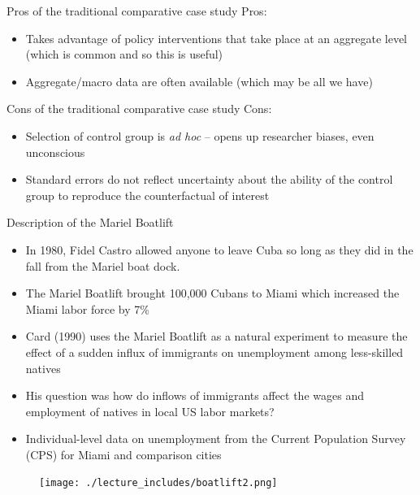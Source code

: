 \documentclass{beamer}
\begin{document}
\begin{frame}{Pros of the traditional comparative case study}
	Pros:

		\begin{itemize}
		\item Takes advantage of policy interventions that take place at an aggregate level (which is common and so this is useful)
		\item Aggregate/macro data are often available (which may be all we have)
		\end{itemize}
\end{frame}

\begin{frame}{Cons of the traditional comparative case study}
	Cons:

		\begin{itemize}
		\item Selection of control group is \emph{ad hoc} -- opens up researcher biases, even unconscious
		\item Standard errors do not reflect uncertainty about the ability of the control group to reproduce the counterfactual of interest
		\end{itemize}
\end{frame}


\begin{frame}{Description of the Mariel Boatlift}
	
	\begin{itemize}
	\item In 1980, Fidel Castro allowed anyone to leave Cuba so long as they did in the fall from the Mariel boat dock.
	\item The Mariel Boatlift brought 100,000 Cubans to Miami which increased the Miami labor force by 7\%
	\item Card (1990) uses the Mariel Boatlift as a natural experiment to measure the effect of a sudden influx of immigrants on unemployment among less-skilled natives
	\item His question was how do inflows of immigrants affect the wages and employment of natives in local US labor markets?
	\item Individual-level data on unemployment from the Current Population Survey (CPS) for Miami and comparison cities
	\end{itemize}
\end{frame}


\begin{frame}[plain]
	\begin{figure}
	\texttt{[image: ./lecture\_includes/boatlift2.png]}
	\end{figure}
\end{frame}
\end{document}
